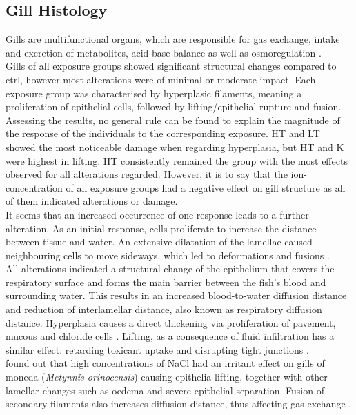 \documentclass[twoside]{article}
\begin{document}
\begin{multicols}{2}
\subsection*{Gill Histology}
Gills are multifunctional organs, which are responsible for gas exchange, intake and excretion of metabolites, acid-base-balance as well as osmoregulation \citep{Evans2008}. \\
Gills of all exposure groups showed significant structural changes compared to ctrl, however most alterations were of minimal or moderate impact. Each exposure group was characterised by hyperplasic filaments, meaning a proliferation of epithelial cells, followed by lifting/epithelial rupture and fusion. \\
Assessing the results, no general rule can be found to explain the magnitude of the response of the individuals to the corresponding exposure. HT and LT showed the most noticeable damage when regarding hyperplasia, but HT and K were highest in lifting. HT consistently remained the group with the most effects observed  for all alterations regarded. However, it is to say that the ion-concentration of all exposure groups had a negative effect on gill structure as all of them indicated alterations or damage. \\
It seems that an increased occurrence of one response leads to a further alteration. As an initial response, cells proliferate to increase the distance between tissue and water. An extensive dilatation of the lamellae caused neighbouring cells to move sideways, which led to deformations and fusions \citep{adriano2005,poleksic1999}. \\
All alterations indicated a structural change of the epithelium that covers the respiratory surface and forms the main barrier between the fish's blood and surrounding water. This results in an increased blood-to-water diffusion distance and reduction of interlamellar distance, also known as respiratory diffusion distance. Hyperplasia causes a direct thickening via proliferation of pavement, mucous and chloride cells \citep{Mcdonald1993}. Lifting, as a consequence of fluid infiltration has a similar effect: retarding toxicant uptake and disrupting tight junctions \cite{Wood2001}. \\
\cite{velasco2008} found out that high concentrations of NaCl had an irritant effect on gills of moneda (\textit{Metynnis orinocensis}) causing epithelia lifting, together with other lamellar changes such as oedema and severe epithelial separation. Fusion of secondary filaments also increases diffusion distance, thus affecting gas exchange \citep{Nowak1992}. \\ \\

\end{multicols}
\end{document}
